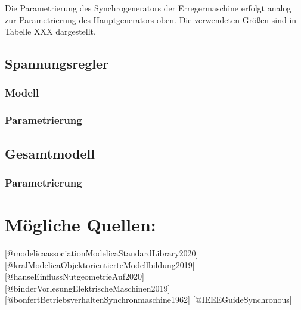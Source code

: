 Die Parametrierung des Synchrogenerators der Erregermaschine erfolgt
analog zur Parametrierung des Hauptgenerators oben. Die verwendeten
Größen sind in Tabelle XXX dargestellt.

\hypertarget{spannungsregler}{%
\subsection{Spannungsregler}\label{spannungsregler}}

\hypertarget{modell-3}{%
\subsubsection{Modell}\label{modell-3}}

\hypertarget{parametrierung-3}{%
\subsubsection{Parametrierung}\label{parametrierung-3}}

\hypertarget{gesamtmodell}{%
\subsection{Gesamtmodell}\label{gesamtmodell}}

\hypertarget{parametrierung-4}{%
\subsubsection{Parametrierung}\label{parametrierung-4}}

\hypertarget{muxf6gliche-quellen}{%
\section{Mögliche Quellen:}\label{muxf6gliche-quellen}}

{[}@modelicaassociationModelicaStandardLibrary2020{]}
{[}@kralModelicaObjektorientierteModellbildung2019{]}
{[}@hanseEinflussNutgeometrieAuf2020{]}
{[}@binderVorlesungElektrischeMaschinen2019{]}
{[}@bonfertBetriebsverhaltenSynchronmaschine1962{]}
{[}@IEEEGuideSynchronous{]}
